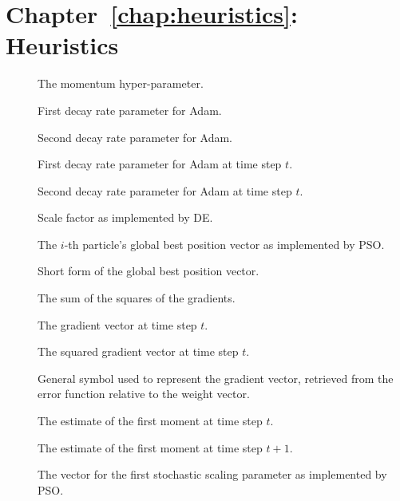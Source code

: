 \section{Chapter~\ref{chap:heuristics}: Heuristics}
\label{sec:symbols:heuristics}

\begin{description}
	\item [\parbox{2cm}{$\alpha$}] \parbox{12.5cm}{The momentum hyper-parameter.}
	\item [\parbox{2cm}{$\beta_{1}$}] \parbox{12.5cm}{First decay rate parameter for \acs{Adam}.}
	\item [\parbox{2cm}{$\beta_{2}$}] \parbox{12.5cm}{Second decay rate parameter for \acs{Adam}.}
	\item [\parbox{2cm}{$\beta^{t}_{1}$}] \parbox{12.5cm}{First decay rate parameter for \acs{Adam} at time step $t$.}
	\item [\parbox{2cm}{$\beta^{t}_{2}$}] \parbox{12.5cm}{Second decay rate parameter for \acs{Adam} at time step $t$.}
	\item [\parbox{2cm}{$\beta$}] \parbox{12.5cm}{Scale factor as implemented by \acs{DE}.}
	\item [\parbox{2cm}{$\boldsymbol{\hat{y}}_{i}(t)$}] \parbox{12.5cm}{The $i$-th particle's global best position vector as implemented by \acs{PSO}.}
	\item [\parbox{2cm}{$\boldsymbol{\hat{y}}$}] \parbox{12.5cm}{Short form of the global best position vector.}
	\item [\parbox{2cm}{$\boldsymbol{G_{t}}$}] \parbox{12.5cm}{The sum of the squares of the gradients.}
	\item [\parbox{2cm}{$\boldsymbol{g}_{t}$}] \parbox{12.5cm}{The gradient vector at time step $t$.}
	\item [\parbox{2cm}{$\boldsymbol{g}^{2}_{t}$}] \parbox{12.5cm}{The squared gradient vector at time step $t$.}
	\item [\parbox{2cm}{$\boldsymbol{g}$}] \parbox{12.5cm}{General symbol used to represent the gradient vector, retrieved from the error function relative to the weight vector.}
	\item [\parbox{2cm}{$\boldsymbol{m}_{t}$}] \parbox{12.5cm}{The estimate of the first moment at time step $t$.}
	\item [\parbox{2cm}{$\boldsymbol{m}_{t+1}$}] \parbox{12.5cm}{The estimate of the first moment at time step $t+1$.}
	\item [\parbox{2cm}{$\boldsymbol{r}_{1}$}] \parbox{12.5cm}{The vector for the first stochastic scaling parameter as implemented by \acs{PSO}.}

\end{description}
